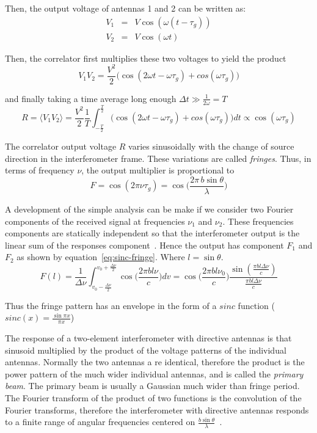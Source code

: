 Then, the output voltage of antennas 1 and 2 can be written as:
\begin{eqnarray}
V_1 &=& V\cos(\omega (t-\tau_g)) \\
V_2 &=& V\cos(\omega t)
\end{eqnarray}

Then, the correlator first multiplies these two voltages to yield the product
\begin{equation}
V_1V_2 = \frac{V^2}{2}\Bigg(\cos(2\omega t - \omega \tau_g) + cos(\omega \tau_g)\Bigg)
\end{equation}
 
and finally taking a time average long enough $\Delta t \gg \frac{1}{2\omega} = T$
\begin{equation}
R = \langle V_1V_2\rangle = \frac{V^2}{2} \frac{1}{T}\int_{-\frac{T}{2}}^{\frac{T}{2}} \big(\cos(2\omega t - \omega \tau_g) + cos(\omega \tau_g)\big) dt
\propto \cos(\omega \tau_g)
\end{equation} 
 
The correlator output voltage $R$ varies sinusoidally with the change of source direction in the interferometer frame. These variations are called \textit{fringes}. Thus, in terms of frequency $\nu$, the output multiplier is proportional to
\begin{equation}
F = \cos(2\pi \nu \tau_g) = \cos\Bigg(\frac{2\pi\, b \sin \theta}{\lambda}\Bigg)
\end{equation}

A development of the simple analysis can be make if we consider two Fourier components of the received signal at frequencies $\nu_1$ and $\nu_2$. These frequencies components are statically independent so that the interferometer output is the linear sum of the responses component~\cite{thompson01}. Hence the output has component $F_1$ and $F_2$ as shown by equation~\ref{eq:sinc-fringe}. Where $l = \sin \theta$.
\begin{equation}
\label{eq:sinc-fringe}
F(l) = \frac{1}{\Delta\nu}\int_{v_0-\frac{\Delta\nu}{2}}^{v_0+\frac{\Delta\nu}{2}}\cos\Bigg(\frac{2\pi b l \nu}{c}\Bigg)dv=
\cos\Bigg(\frac{2\pi b l \nu_0}{c}\Bigg)\frac{\sin(\frac{\pi b l \Delta \nu}{c})}{\frac{\pi b l \Delta \nu}{c}}
\end{equation}
 
Thus the fringe pattern has an envelope in the form of a $sinc$ function ($sinc(x) = \frac{\sin\pi x}{\pi x}$)

The response of a two-element interferometer with directive antennas is that sinusoid multiplied by the product of the voltage patterns of the individual antennas. Normally the two antennas a re identical, therefore the product is the power pattern of the much wider individual antennas, and is called the \textit{primary beam}. The primary beam is usually a Gaussian much wider than fringe period. The Fourier transform of the product of two functions is the convolution of the Fourier transforms, therefore the interferometer with directive antennas responds to a finite range of angular frequencies centered on $\frac{b\sin\theta}{\lambda}$~\cite{condon10}.

